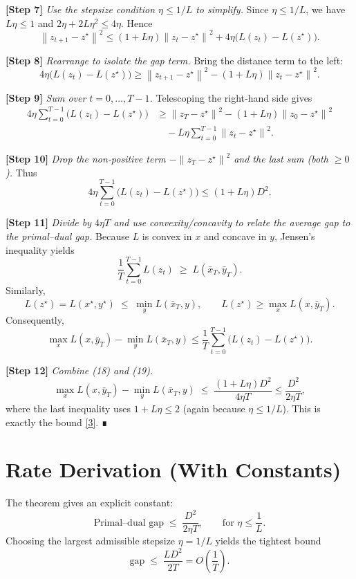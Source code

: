 \documentclass{article}
\newcommand{\norm}[1]{\left\lVert#1\right\rVert}
\begin{document}
\noindent\textbf{[Step 7]} \emph{Use the stepsize condition $\eta\le 1/L$ to simplify.}  
Since $\eta\le 1/L$, we have $L\eta\le 1$ and $2\eta+2L\eta^2\le 4\eta$. Hence
\[
\norm{z_{t+1}-z^\star}^2
\le (1+L\eta)\norm{z_t-z^\star}^2
   +4\eta\bigl(L(z_t)-L(z^\star)\bigr).
\tag{15}
\]

\noindent\textbf{[Step 8]} \emph{Rearrange to isolate the gap term.}  
Bring the distance term to the left:
\[
4\eta\bigl(L(z_t)-L(z^\star)\bigr)
\ge \norm{z_{t+1}-z^\star}^2-(1+L\eta)\norm{z_t-z^\star}^2 .
\tag{16}
\]

\noindent\textbf{[Step 9]} \emph{Sum over $t=0,\dots,T-1$.}  
Telescoping the right‑hand side gives
\[
\begin{aligned}
4\eta\sum_{t=0}^{T-1}\!\bigl(L(z_t)-L(z^\star)\bigr)
&\ge \norm{z_T-z^\star}^2-(1+L\eta)\norm{z_0-z^\star}^2\\
&\quad -L\eta\sum_{t=0}^{T-1}\norm{z_t-z^\star}^2 .
\end{aligned}
\tag{17}
\]

\noindent\textbf{[Step 10]} \emph{Drop the non‑positive term $-\norm{z_T-z^\star}^2$ and the last sum (both $\ge 0$).}  
Thus
\[
4\eta\sum_{t=0}^{T-1}\!\bigl(L(z_t)-L(z^\star)\bigr)
\le (1+L\eta)D^2 .
\tag{18}
\]

\noindent\textbf{[Step 11]} \emph{Divide by $4\eta T$ and use convexity/concavity to relate the average gap to the primal–dual gap.}  
Because $L$ is convex in $x$ and concave in $y$, Jensen’s inequality yields
\[
\frac{1}{T}\sum_{t=0}^{T-1}L(z_t)
\;\ge\;
L(\bar{x}_T,\bar{y}_T) .
\]
Similarly,
\[
L(z^\star)=L(x^\star ,y^\star)
\;\le\;
\min_{y}L(\bar{x}_T,y),\qquad
L(z^\star)\ge \max_{x}L(x,\bar{y}_T).
\]
Consequently,
\[
\max_{x}L(x,\bar{y}_T)-\min_{y}L(\bar{x}_T,y)
\le \frac{1}{T}\sum_{t=0}^{T-1}\!\bigl(L(z_t)-L(z^\star)\bigr).
\tag{19}
\]

\noindent\textbf{[Step 12]} \emph{Combine (18) and (19).}  
\[
\max_{x}L(x,\bar{y}_T)-\min_{y}L(\bar{x}_T,y)
\;\le\;
\frac{(1+L\eta)D^2}{4\eta T}
\le
\frac{D^2}{2\eta T},
\]
where the last inequality uses $1+L\eta\le 2$ (again because $\eta\le 1/L$). This is exactly the bound \eqref{3}. ∎

\section*{Rate Derivation (With Constants)}
The theorem gives an explicit constant:
\[
\boxed{
\text{Primal–dual gap}\;\le\;\frac{D^2}{2\eta T},
\qquad\text{for }\eta\le\frac{1}{L}.
}
\]
Choosing the largest admissible stepsize $\eta=1/L$ yields the tightest bound
\[
\text{gap}\;\le\;\frac{L D^2}{2T}=O\!\left(\frac{1}{T}\right).
\]
\end{document}
